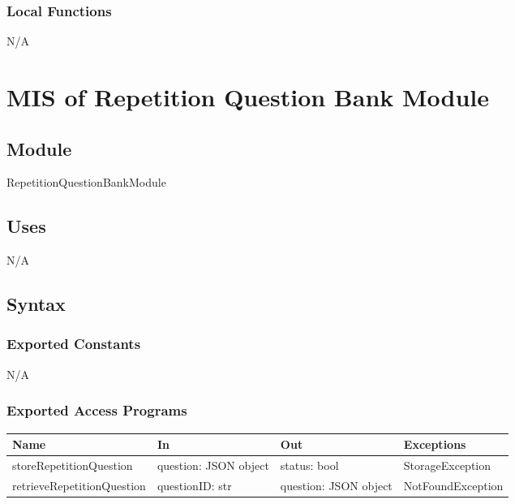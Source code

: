 \documentclass[12pt, titlepage]{article}
\begin{document}
\subsubsection{Local Functions}

N/A
\section{MIS of Repetition Question Bank Module} \label{RepetitionQuestionBankModule}

\subsection{Module}

RepetitionQuestionBankModule

\subsection{Uses}

N/A

\subsection{Syntax}

\subsubsection{Exported Constants}

N/A

\subsubsection{Exported Access Programs}

\begin{center}
\begin{tabular}{p{5cm} p{3cm} p{3cm} p{5cm}}
\hline
\textbf{Name} & \textbf{In} & \textbf{Out} & \textbf{Exceptions} \\
\hline
storeRepetitionQuestion & \raggedright\arraybackslash question: JSON object & \raggedright\arraybackslash status: bool & \raggedright\arraybackslash StorageException \\
\hline
retrieveRepetitionQuestion & \raggedright\arraybackslash questionID: str & \raggedright\arraybackslash question: JSON object & \raggedright\arraybackslash NotFoundException \\
\hline
\end{tabular}
\end{center}
\end{document}
